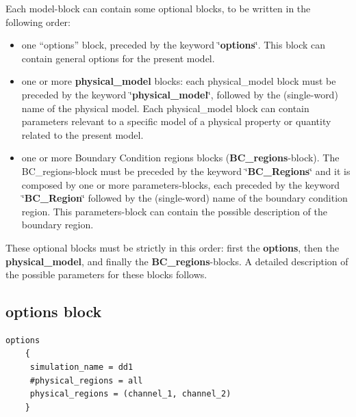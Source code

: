 Each model-block can  contain some  optional blocks, to be written in the  following order:
   
   
   
   
\begin{itemize}
	
   \item one    "`options"' block, preceded by the keyword \char`\"{}\textbf{options}\char`\"{}. This block can contain    general  options for the present  model.
	\item  one or more  \textbf{physical\_model} blocks: each physical\_model block must be preceded by the keyword \char`\"{}\textbf{physical\_\-model}\char`\"{}, followed by the (single-word) name of the physical model.
	Each physical\_model block can contain parameters  relevant to a specific model of a physical property or quantity related to the present model.

\item    one or more  Boundary Condition regions blocks (\textbf{BC\_\-regions}-block).
   The BC\_\-regions-block must be preceded by the keyword \char`\"{}\textbf{BC\_\-Regions}\char`\"{} and it is composed by one or more parameters-blocks, each preceded by the keyword \char`\"{}\textbf{BC\_\-Region}\char`\"{} followed by the (single-word)  name of the boundary condition region. This parameters-block can contain the possible description of the boundary region.
\end{itemize}


 
These optional blocks must be strictly in this order: first the \textbf{options}, then the \textbf{physical\_\-model}, and finally the \textbf{BC\_\-regions}-blocks. A detailed description of the possible parameters for these blocks  follows.



\subsection{options block }

\begin{verbatim}
options
    {
     simulation_name = dd1
     #physical_regions = all
     physical_regions = (channel_1, channel_2)
    }
\end{verbatim}

